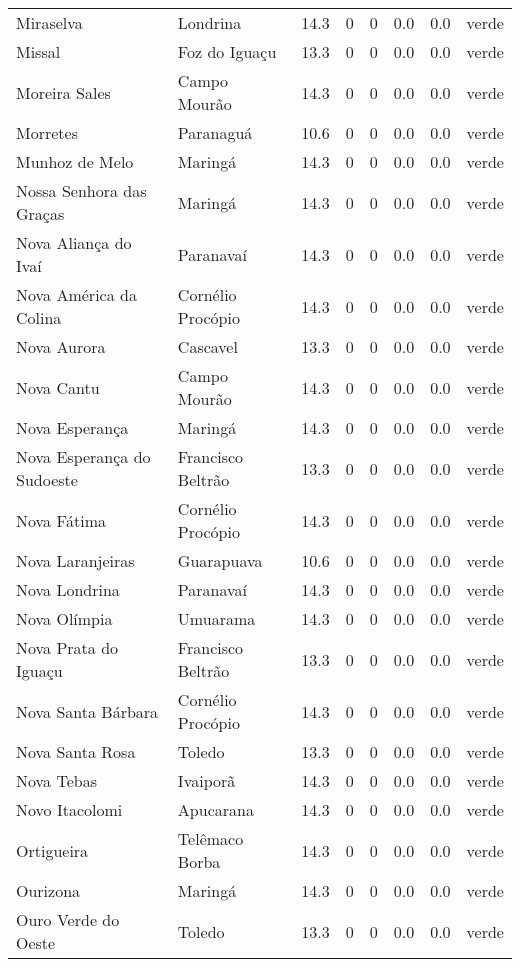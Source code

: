 \begin{longtable}{l|lllllll}
  Miraselva & Londrina & 14.3 & 0 & 0 & 0.0 & 0.0 & verde \\ 
  Missal & Foz do Iguaçu & 13.3 & 0 & 0 & 0.0 & 0.0 & verde \\ 
  Moreira Sales & Campo Mourão & 14.3 & 0 & 0 & 0.0 & 0.0 & verde \\ 
  Morretes & Paranaguá & 10.6 & 0 & 0 & 0.0 & 0.0 & verde \\ 
  Munhoz de Melo & Maringá & 14.3 & 0 & 0 & 0.0 & 0.0 & verde \\ 
  Nossa Senhora das Graças & Maringá & 14.3 & 0 & 0 & 0.0 & 0.0 & verde \\ 
  Nova Aliança do Ivaí & Paranavaí & 14.3 & 0 & 0 & 0.0 & 0.0 & verde \\ 
  Nova América da Colina & Cornélio Procópio & 14.3 & 0 & 0 & 0.0 & 0.0 & verde \\ 
  Nova Aurora & Cascavel & 13.3 & 0 & 0 & 0.0 & 0.0 & verde \\ 
  Nova Cantu & Campo Mourão & 14.3 & 0 & 0 & 0.0 & 0.0 & verde \\ 
  Nova Esperança & Maringá & 14.3 & 0 & 0 & 0.0 & 0.0 & verde \\ 
  Nova Esperança do Sudoeste & Francisco Beltrão & 13.3 & 0 & 0 & 0.0 & 0.0 & verde \\ 
  Nova Fátima & Cornélio Procópio & 14.3 & 0 & 0 & 0.0 & 0.0 & verde \\ 
  Nova Laranjeiras & Guarapuava & 10.6 & 0 & 0 & 0.0 & 0.0 & verde \\ 
  Nova Londrina & Paranavaí & 14.3 & 0 & 0 & 0.0 & 0.0 & verde \\ 
  Nova Olímpia & Umuarama & 14.3 & 0 & 0 & 0.0 & 0.0 & verde \\ 
  Nova Prata do Iguaçu & Francisco Beltrão & 13.3 & 0 & 0 & 0.0 & 0.0 & verde \\ 
  Nova Santa Bárbara & Cornélio Procópio & 14.3 & 0 & 0 & 0.0 & 0.0 & verde \\ 
  Nova Santa Rosa & Toledo & 13.3 & 0 & 0 & 0.0 & 0.0 & verde \\ 
  Nova Tebas & Ivaiporã & 14.3 & 0 & 0 & 0.0 & 0.0 & verde \\ 
  Novo Itacolomi & Apucarana & 14.3 & 0 & 0 & 0.0 & 0.0 & verde \\ 
  Ortigueira & Telêmaco Borba & 14.3 & 0 & 0 & 0.0 & 0.0 & verde \\ 
  Ourizona & Maringá & 14.3 & 0 & 0 & 0.0 & 0.0 & verde \\ 
  Ouro Verde do Oeste & Toledo & 13.3 & 0 & 0 & 0.0 & 0.0 & verde \\ 

\end{longtable}
